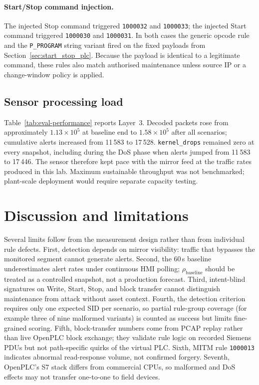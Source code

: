 \documentclass[../main.tex]{subfiles}
\begin{document}
\paragraph{Start/Stop command injection.}
The injected Stop command triggered \texttt{1000032} and \texttt{1000033}; the injected Start command triggered \texttt{1000030} and \texttt{1000031}. In both cases the generic opcode rule and the \texttt{P\_PROGRAM} string variant fired on the fixed payloads from Section~\ref{sec:start_stop_plc}. Because the payload is identical to a legitimate command, these rules also match authorised maintenance unless source IP or a change-window policy is applied.

\subsection{Sensor processing load}
\label{sec:eval-performance}

Table~\ref{tab:eval-performance} reports Layer~3. Decoded packets rose from approximately $1.13 \times 10^5$ at baseline end to $1.58 \times 10^5$ after all scenarios; cumulative alerts increased from 11\,583 to 17\,528. \texttt{kernel\_drops} remained zero at every snapshot, including during the DoS phase when alerts jumped from 11\,583 to 17\,446. The sensor therefore kept pace with the mirror feed at the traffic rates produced in this lab. Maximum sustainable throughput was not benchmarked; plant-scale deployment would require separate capacity testing.

\section{Discussion and limitations}
\label{sec:eval-discussion}

Several limits follow from the measurement design rather than from individual rule defects. First, detection depends on mirror visibility: traffic that bypasses the monitored segment cannot generate alerts. Second, the 60\,s baseline underestimates alert rates under continuous HMI polling; $\rho_{\mathrm{baseline}}$ should be treated as a controlled snapshot, not a production forecast. Third, intent-blind signatures on Write, Start, Stop, and block transfer cannot distinguish maintenance from attack without asset context. Fourth, the detection criterion requires only one expected SID per scenario, so partial rule-group coverage (for example three of nine malformed variants) is counted as success but limits fine-grained scoring. Fifth, block-transfer numbers come from PCAP replay rather than live OpenPLC block exchange; they validate rule logic on recorded Siemens PDUs but not path-specific quirks of the virtual PLC. Sixth, MITM rule \texttt{1000013} indicates abnormal read-response volume, not confirmed forgery. Seventh, OpenPLC's S7 stack differs from commercial CPUs, so malformed and DoS effects may not transfer one-to-one to field devices.

\label{sec:eval-dos}
\label{sec:eval-normal-impact}
\end{document}
